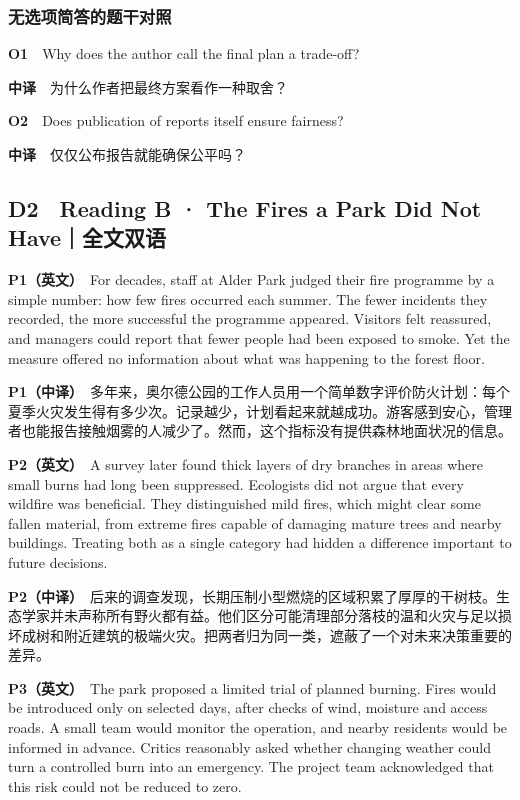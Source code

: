 \documentclass[
  11pt,
]{ctexart}
\begin{document}
\subsubsection{无选项简答的题干对照}\label{ux65e0ux9009ux9879ux7b80ux7b54ux7684ux9898ux5e72ux5bf9ux7167}

\textbf{O1}　Why does the author call the final plan a trade-off?

\textbf{中译}　为什么作者把最终方案看作一种取舍？

\textbf{O2}　Does publication of reports itself ensure fairness?

\textbf{中译}　仅仅公布报告就能确保公平吗？

\subsection{D2　Reading B · The Fires a Park Did Not
Have｜全文双语}\label{d2-reading-b-the-fires-a-park-did-not-haveux5168ux6587ux53ccux8bed}

\textbf{P1（英文）}　For decades, staff at Alder Park judged their fire
programme by a simple number: how few fires occurred each summer. The
fewer incidents they recorded, the more successful the programme
appeared. Visitors felt reassured, and managers could report that fewer
people had been exposed to smoke. Yet the measure offered no information
about what was happening to the forest floor.

\textbf{P1（中译）}　多年来，奥尔德公园的工作人员用一个简单数字评价防火计划：每个夏季火灾发生得有多少次。记录越少，计划看起来就越成功。游客感到安心，管理者也能报告接触烟雾的人减少了。然而，这个指标没有提供森林地面状况的信息。

\textbf{P2（英文）}　A survey later found thick layers of dry branches
in areas where small burns had long been suppressed. Ecologists did not
argue that every wildfire was beneficial. They distinguished mild fires,
which might clear some fallen material, from extreme fires capable of
damaging mature trees and nearby buildings. Treating both as a single
category had hidden a difference important to future decisions.

\textbf{P2（中译）}　后来的调查发现，长期压制小型燃烧的区域积累了厚厚的干树枝。生态学家并未声称所有野火都有益。他们区分可能清理部分落枝的温和火灾与足以损坏成树和附近建筑的极端火灾。把两者归为同一类，遮蔽了一个对未来决策重要的差异。

\textbf{P3（英文）}　The park proposed a limited trial of planned
burning. Fires would be introduced only on selected days, after checks
of wind, moisture and access roads. A small team would monitor the
operation, and nearby residents would be informed in advance. Critics
reasonably asked whether changing weather could turn a controlled burn
into an emergency. The project team acknowledged that this risk could
not be reduced to zero.
\end{document}
